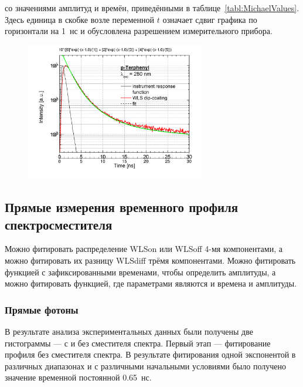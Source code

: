со значениями амплитуд и времён, приведёнными в таблице~\ref{tabl:MichaelValues}. Здесь единица в скобке возле переменной $ t $ означает сдвиг графика по горизонтали на 1~нс и обусловлена разрешением измерительного прибора.

\begin{figure}[H]
\includegraphics[width=0.7\textwidth]{pictures/FluoroFitting_shift_1ns_2.png}
\caption{}
\label{fig:MichaelProfileFit}
\end{figure}


\subsection{Прямые измерения временного профиля спектросместителя}

Можно фитировать распределение WLS\textunderscore on или WLS\textunderscore off 4-мя компонентами, а можно фитировать их разницу WLS\textunderscore diff трёмя компонентами. Можно фитировать функцией с зафиксированными временами, чтобы определить амплитуды, а можно фитировать функцией, где параметрами являются и времена и амплитуды.

\subsubsection{Прямые фотоны}

В результате анализа экспериментальных данных были получены две гистограммы --- с и без сместителя спектра. Первый этап --- фитирование профиля без сместителя спектра. В результате фитирования одной экспонентой в различных диапазонах и с различными начальными условиями было получено значение временной постоянной 0.65~нс.

